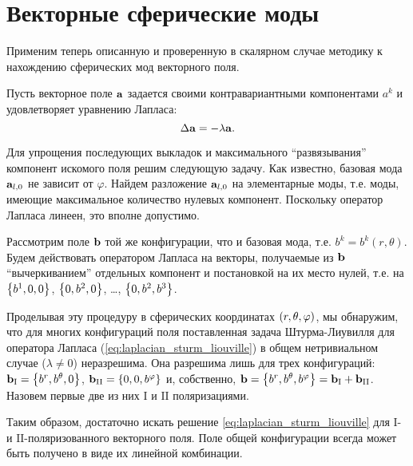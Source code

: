 \documentclass[12pt,a4paper]{article}
\begin{document}

    \section{Векторные сферические моды}

        Применим теперь описанную и проверенную в скалярном случае методику к нахождению сферических мод векторного поля.

        Пусть векторное поле $\vb{a}$ задается своими контравариантными компонентами $a^k$ и удовлетворяет уравнению Лапласа:
        \begin{equation}\label{eq:laplacian_sturm_liouville}
            \Delta \vb{a} = - \lambda \vb{a} .
        \end{equation}

        Для упрощения последующих выкладок и максимального \enquote{развязывания} компонент искомого поля решим следующую задачу. Как известно, базовая мода $\vb{a}_{l,0}$ не зависит от $\varphi$. Найдем разложение $\vb{a}_{l,0}$ на элементарные моды, т.е. моды, имеющие максимальное количество нулевых компонент. Поскольку оператор Лапласа линеен, это вполне допустимо.

        Рассмотрим поле $\vb{b}$ той же конфигурации, что и базовая мода, т.е. $b^k = b^k(r,\theta)$. Будем действовать оператором Лапласа на векторы, получаемые из $\vb{b}$ \enquote{вычеркиванием} отдельных компонент и постановкой на их место нулей, т.е. на $\qty{ b^1, 0, 0 }$, $\qty{ 0, b^2, 0 }$, \dots, $\qty{ 0, b^2, b^3 }$.

        Проделывая эту процедуру в сферических координатах $\qty(r, \theta, \varphi)$, мы обнаружим, что для многих конфигураций поля поставленная задача Штурма-Лиувилля для оператора Лапласа (\autoref{eq:laplacian_sturm_liouville}) в общем нетривиальном случае ($\lambda \neq 0$) неразрешима. Она разрешима лишь для трех конфигураций: $\vb{b}_{\mathrm{I}} = \qty{ b^r, b^\theta, 0 }$, $\vb{b}_{\mathrm{II}} = \qty{ 0, 0, b^\varphi }$ и, собственно, $\vb{b} = \qty{ b^r, b^\theta, b^\varphi } = \vb{b}_{\mathrm{I}} + \vb{b}_{\mathrm{II}}$. Назовем первые две из них $\mathrm{I}$ и $\mathrm{II}$ поляризациями.

        Таким образом, достаточно искать решение \autoref{eq:laplacian_sturm_liouville} для $\mathrm{I}$- и $\mathrm{II}$-поляризованного векторного поля. Поле общей конфигурации всегда может быть получено в виде их линейной комбинации.
\end{document}
